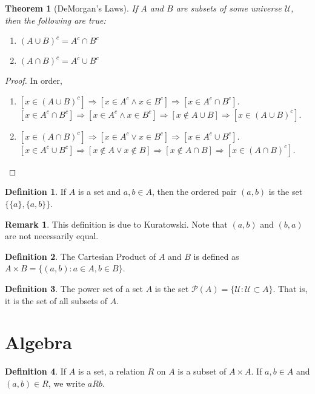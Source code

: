 \documentclass[oneside]{book}
\newtheorem{theorem}{Theorem}[section]
\theoremstyle{definition}
\newtheorem{definition}{Definition}[section]
\newtheorem{remark}{Remark}[section]
\begin{document}
\begin{theorem}[DeMorgan's Laws]
If $A$ and $B$ are subsets of some universe $\mathcal{U}$, then the following are true:
\begin{enumerate}
\item $(A\cup B)^c = A^c \cap B^c$
\item $(A\cap B)^c = A^c \cup B^c$
\end{enumerate}
\end{theorem}
\begin{proof}
In order,
\begin{enumerate}
\item $[x\in (A\cup B)^c]\Rightarrow [x\in A^c\land x\in B^c]\Rightarrow [x\in A^c\cap B^c]$. $[x\in A^c \cap B^c]\Rightarrow [x\in A^c\land x\in B^c]\Rightarrow [x\notin A\cup B]\Rightarrow [x\in (A\cup B)^c]$.
\item $[x\in (A\cap B)^c]\Rightarrow [x\in A^c\lor x\in B^c]\Rightarrow [x\in A^c \cup B^c]$. $[x\in A^c \cup B^c]\Rightarrow [x\notin A\lor x\notin B]\Rightarrow [x\notin A\cap B]\Rightarrow [x\in (A\cap B)^c]$.
\end{enumerate}
\end{proof}

\begin{definition}
If $A$ is a set and $a,b\in A$, then the ordered pair $(a,b)$ is the set $\{\{a\},\{a,b\}\}$.
\end{definition}

\begin{remark}
This definition is due to Kuratowski. Note that $(a,b)$ and $(b,a)$ are not necessarily equal.
\end{remark}

\begin{definition}
The Cartesian Product of $A$ and $B$ is defined as $A\times B = \{(a,b):a\in A, b\in B\}$.
\end{definition}

\begin{definition}
The power set of a set $A$ is the set $\mathcal{P}(A) = \{\mathcal{U}:\mathcal{U}\subset A\}$. That is, it is the set of all subsets of $A$.
\end{definition}

\section{Algebra}

\begin{definition}
If $A$ is a set, a relation $R$ on $A$ is a subset of $A\times A$. If $a,b\in A$ and $(a,b)\in R$, we write $aR b$.
\end{definition}
\end{document}
